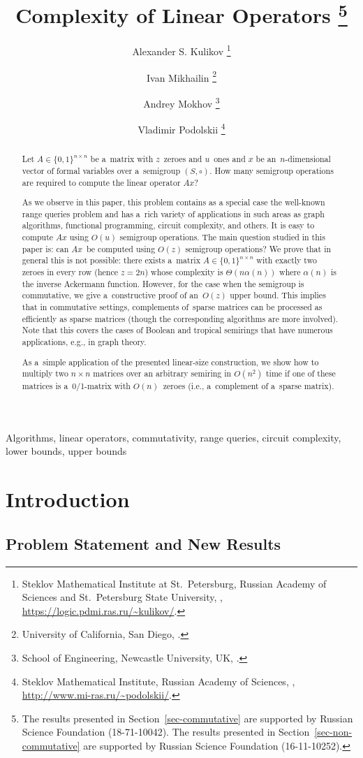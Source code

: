 \documentclass[review,onefignum,onetabnum]{siamart190516}
\title{Complexity of Linear Operators
\thanks{The results presented in Section~\ref{sec-commutative} are supported by
Russian Science Foundation (18-71-10042). The results presented in
Section~\ref{sec-non-commutative} are supported by Russian Science Foundation
(16-11-10252).}}
\author{Alexander S. Kulikov
  \thanks{Steklov Mathematical Institute at St.~Petersburg, Russian Academy of
  Sciences and St.~Petersburg State University, \email{kulikov@logic.pdmi.ras.ru},
  \url{https://logic.pdmi.ras.ru/\~kulikov/}.}
\and Ivan Mikhailin
  \thanks{University of California, San Diego, \email{imikhail@eng.ucsd.edu}.}
\and Andrey Mokhov
  \thanks{School of Engineering, Newcastle University, UK,
  \email{andrey.mokhov@ncl.ac.uk}.}
\and Vladimir Podolskii
  \thanks{Steklov Mathematical Institute, Russian Academy of Sciences,
  \email{podolskii@mi-ras.ru}, \url{http://www.mi-ras.ru/\~podolskii/}.}}
\begin{document}
\maketitle

\begin{abstract}
Let $A \in \{0,1\}^{n \times n}$ be a~matrix with $z$~zeroes
and $u$~ones and $x$ be an~$n$-dimensional vector of
formal variables over a~semigroup $(S, \circ)$.
How many semigroup operations are required to compute the linear operator $Ax$?

As we observe in this paper, this problem contains as a special case the well-known
range queries problem and has a~rich variety of applications in
such areas as graph algorithms, functional programming, circuit complexity,
and others. It is easy to compute $Ax$ using $O(u)$ semigroup
operations.
The main question studied in this paper is:
can $Ax$~be computed using $O(z)$ semigroup operations?
We prove that in general this is not possible: there exists
a~matrix $A \in \{0,1\}^{n \times n}$ with exactly two zeroes in every row
(hence $z=2n$) whose complexity is $\Theta(n\alpha(n))$
where $\alpha(n)$ is the inverse Ackermann function.
However, for the case when the semigroup is commutative,
we give a~constructive proof of an~$O(z)$ upper bound.
This implies that in commutative settings, complements of~sparse
matrices can
be processed as efficiently as sparse matrices (though the
corresponding
algorithms are more involved). Note that this covers the
cases of Boolean and tropical semirings that have numerous
applications, e.g., in graph theory.

As a~simple application of the presented linear-size construction,
we show
how to multiply two $n\times n$ matrices over an arbitrary
semiring in $O(n^2)$
time if one of these matrices is a~0/1-matrix with $O(n)$~zeroes
(i.e., a~complement of a~sparse matrix).
\end{abstract}

\begin{keywords}
Algorithms, linear operators, commutativity, range queries, circuit complexity,
lower bounds, upper bounds
\end{keywords}


\section{Introduction}
\subsection{Problem Statement and New Results}
\end{document}
